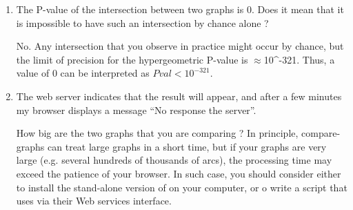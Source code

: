 \begin{enumerate}

\item The P-value of the intersection between two graphs is 0. Does it
  mean that it is impossible to have such an intersection by chance
  alone ?

  No. Any intersection that you observe in practice might occur by
  chance, but the limit of precision for the hypergeometric P-value is
  $\approx$10^{-321}. Thus, a value of 0 can be interpreted as $Pval <
  10^{-321}.$

\item The web server indicates that the result will appear, and after
  a few minutes my browser displays a message ``No response the
  server''.

  How big are the two graphs that you are comparing ? In principle,
  compare-graphs can treat large graphs in a short time, but if your
  graphs are very large (e.g. several hundreds of thousands of arcs),
  the processing time may exceed the patience of your browser. In such
  case, you should consider either to install the stand-alone version
  of \neat on your computer, or o write a script that uses \neat via
  their Web services interface.

\end{enumerate}
